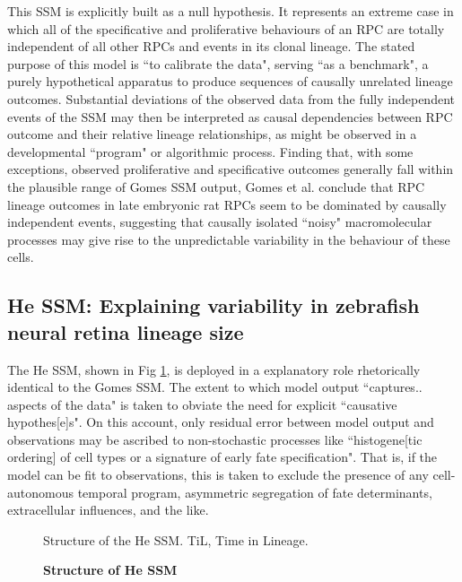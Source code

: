 \documentclass[10pt,letterpaper]{article}
\begin{document}
This SSM is explicitly built as a null hypothesis. It represents an extreme case in which all of the specificative and proliferative behaviours of an RPC are totally independent of all other RPCs and events in its clonal lineage. The stated purpose of this model is ``to calibrate the data", serving ``as a benchmark"\cite{Gomes2011}, a purely hypothetical apparatus to produce sequences of causally unrelated lineage outcomes. Substantial deviations of the observed data from the fully independent events of the SSM may then be interpreted as causal dependencies between RPC outcome and their relative lineage relationships, as might be observed in a developmental ``program" or algorithmic process. Finding that, with some exceptions, observed proliferative and specificative outcomes generally fall within the plausible range of Gomes SSM output, Gomes et al. conclude that RPC lineage outcomes in late embryonic rat RPCs seem to be dominated by causally independent events, suggesting that causally isolated ``noisy" macromolecular processes may give rise to the unpredictable variability in the behaviour of these cells. 
 
 \subsection*{He SSM: Explaining variability in zebrafish neural retina lineage size}
 
The He SSM, shown in Fig \ref{HeSSM}, is deployed in a explanatory role rhetorically identical to the Gomes SSM. The extent to which model output ``captures.. aspects of the data" is taken to obviate the need for explicit ``causative hypothes[e]s". On this account, only residual error between model output and observations may be ascribed to non-stochastic processes like ``histogene[tic ordering] of cell types or a signature of early fate specification". That is, if the model can be fit to observations, this is taken to exclude the presence of any cell-autonomous temporal program, asymmetric segregation of fate determinants, extracellular influences, and the like. 

\begin{figure}[!h]
\caption{{\bf Structure of He SSM}}
Structure of the He SSM. TiL, Time in Lineage.
\label{HeSSM}
\end{figure}
\end{document}
